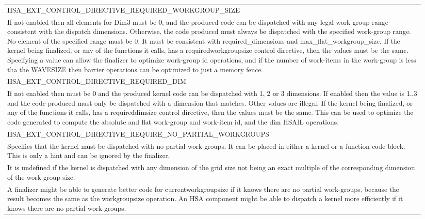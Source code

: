 \documentclass[final]{book}
\newcommand{\reftyp}[1]{#1}
\newcommand{\refenu}[1]{\reftyp{#1}}
\begin{document}
\begin{longtable}{@{\hspace{2em}}p{\linewidth-2em}}
\hspace{-2em}\refenu{HSA_\-EXT_\-CONTROL_\-DIRECTIVE_\-REQUIRED_\-WORKGROUP_\-SIZE}\\If not enabled then all elements for Dim3 must be 0, and the produced code can be dispatched with any legal work-group range consistent with the dispatch dimensions. Otherwise, the code produced must always be dispatched with the specified work-group range. No element of the specified range must be 0. It must be consistent with required_\-dimensions and max_\-flat_\-workgroup_\-size. If the kernel being finalized, or any of the functions it calls, has a requiredworkgroupsize control directive, then the values must be the same. Specifying a value can allow the finalizer to optimize work-group id operations, and if the number of work-items in the work-group is less tha the WAVESIZE then barrier operations can be optimized to just a memory fence.\\[2mm]
\hspace{-2em}\refenu{HSA_\-EXT_\-CONTROL_\-DIRECTIVE_\-REQUIRED_\-DIM}\\If not enabled then must be 0 and the produced kernel code can be dispatched with 1, 2 or 3 dimensions. If enabled then the value is 1..3 and the code produced must only be dispatched with a dimension that matches. Other values are illegal. If the kernel being finalized, or any of the functions it calls, has a requireddimsize control directive, then the values must be the same. This can be used to optimize the code generated to compute the absolute and flat work-group and work-item id, and the dim HSAIL operations.\\[2mm]
\hspace{-2em}\refenu{HSA_\-EXT_\-CONTROL_\-DIRECTIVE_\-REQUIRE_\-NO_\-PARTIAL_\-WORKGROUPS}\\Specifies that the kernel must be dispatched with no partial work-groups. It can be placed in either a kernel or a function code block. This is only a hint and can be ignored by the finalizer.\\[2mm]
It is undefined if the kernel is dispatched with any dimension of the grid size not being an exact multiple of the corresponding dimension of the work-group size.\\[2mm]
A finalizer might be able to generate better code for currentworkgroupsize if it knows there are no partial work-groups, because the result becomes the same as the workgroupsize operation. An HSA component might be able to dispatch a kernel more efficiently if it knows there are no partial work-groups.\\[2mm]

\end{longtable}
\end{document}
